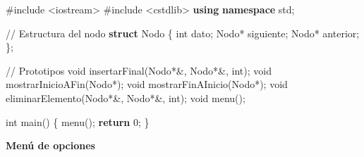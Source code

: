 \documentclass[
  11pt,
  a4paper,
  DIV=11,
  numbers=noendperiod]{scrreprt}
\newenvironment{Shaded}{\begin{snugshade}}{\end{snugshade}}
\newcommand{\CommentTok}[1]{\textcolor[rgb]{0.37,0.37,0.37}{#1}}
\newcommand{\ControlFlowTok}[1]{\textcolor[rgb]{0.00,0.23,0.31}{\textbf{#1}}}
\newcommand{\DataTypeTok}[1]{\textcolor[rgb]{0.68,0.00,0.00}{#1}}
\newcommand{\DecValTok}[1]{\textcolor[rgb]{0.68,0.00,0.00}{#1}}
\newcommand{\ImportTok}[1]{\textcolor[rgb]{0.00,0.46,0.62}{#1}}
\newcommand{\KeywordTok}[1]{\textcolor[rgb]{0.00,0.23,0.31}{\textbf{#1}}}
\newcommand{\NormalTok}[1]{\textcolor[rgb]{0.00,0.23,0.31}{#1}}
\newcommand{\OperatorTok}[1]{\textcolor[rgb]{0.37,0.37,0.37}{#1}}
\newcommand{\PreprocessorTok}[1]{\textcolor[rgb]{0.68,0.00,0.00}{#1}}
\begin{document}
\begin{Shaded}
\begin{Highlighting}[]
\PreprocessorTok{\#include }\ImportTok{\textless{}iostream\textgreater{}}
\PreprocessorTok{\#include }\ImportTok{\textless{}cstdlib\textgreater{}}
\KeywordTok{using} \KeywordTok{namespace}\NormalTok{ std}\OperatorTok{;}

\CommentTok{// Estructura del nodo}
\KeywordTok{struct}\NormalTok{ Nodo }\OperatorTok{\{}
    \DataTypeTok{int}\NormalTok{ dato}\OperatorTok{;}
\NormalTok{    Nodo}\OperatorTok{*}\NormalTok{ siguiente}\OperatorTok{;}
\NormalTok{    Nodo}\OperatorTok{*}\NormalTok{ anterior}\OperatorTok{;}
\OperatorTok{\};}

\CommentTok{// Prototipos}
\DataTypeTok{void}\NormalTok{ insertarFinal}\OperatorTok{(}\NormalTok{Nodo}\OperatorTok{*\&,}\NormalTok{ Nodo}\OperatorTok{*\&,} \DataTypeTok{int}\OperatorTok{);}
\DataTypeTok{void}\NormalTok{ mostrarInicioAFin}\OperatorTok{(}\NormalTok{Nodo}\OperatorTok{*);}
\DataTypeTok{void}\NormalTok{ mostrarFinAInicio}\OperatorTok{(}\NormalTok{Nodo}\OperatorTok{*);}
\DataTypeTok{void}\NormalTok{ eliminarElemento}\OperatorTok{(}\NormalTok{Nodo}\OperatorTok{*\&,}\NormalTok{ Nodo}\OperatorTok{*\&,} \DataTypeTok{int}\OperatorTok{);}
\DataTypeTok{void}\NormalTok{ menu}\OperatorTok{();}

\DataTypeTok{int}\NormalTok{ main}\OperatorTok{()} \OperatorTok{\{}
\NormalTok{    menu}\OperatorTok{();}
    \ControlFlowTok{return} \DecValTok{0}\OperatorTok{;}
\OperatorTok{\}}
\end{Highlighting}
\end{Shaded}

\textbf{Menú de opciones}
\end{document}
